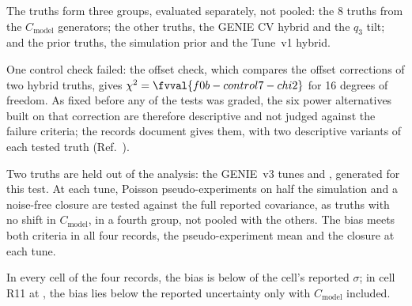The truths form three groups, evaluated separately, not pooled: the 8 truths from the $C_{\mathrm{model}}$ generators; the other truths, the GENIE CV hybrid and the $q_3$ tilt; and the prior truths, the simulation prior and the Tune~v1 hybrid.

One control check failed: the offset check, which compares the offset corrections of two hybrid truths, gives $\chi^2=\fvval{f0b-control7-chi2}$ for 16 degrees of freedom. As fixed before any of the tests was graded, the six power alternatives built on that correction are therefore descriptive and not judged against the failure criteria; the records document gives them, with two descriptive variants of each tested truth (Ref.~\cite{NoteRecords2026}). %

Two truths are held out of the analysis: the GENIE~v3 tunes  and , generated for this test. At each tune,  Poisson pseudo-experiments on half the simulation and a noise-free closure are tested against the full reported covariance, as truths with no shift in $C_{\mathrm{model}}$, in a fourth group, not pooled with the others. The bias meets both criteria in all four records, the pseudo-experiment mean and the closure at each tune.

In every cell of the four records, the bias is below  of the cell's reported $\sigma$; in cell R11 at , the bias lies below the reported uncertainty only with $C_{\mathrm{model}}$ included.

